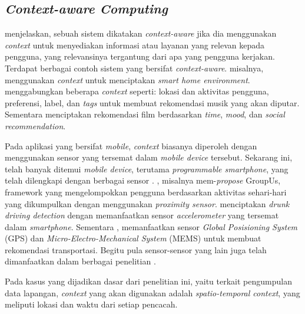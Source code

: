 \subsection{\textit{Context-aware Computing}}
\label{ssec:context-aware-computing}
\citep{dey_understanding_2001} menjelaskan, sebuah sistem dikatakan \textit{context-aware} jika dia menggunakan \textit{context} untuk menyediakan informasi atau layanan yang relevan kepada pengguna, yang relevansinya tergantung dari apa yang pengguna kerjakan. Terdapat berbagai contoh sistem yang bersifat \textit{context-aware}. \citep{tsai_context-aware_2016} misalnya, menggunakan \textit{context} untuk menciptakan \textit{smart home environment}. \citep{magara_mplist:_2016} menggabungkan beberapa \textit{context} seperti: lokasi dan aktivitas pengguna, preferensi, label, dan \textit{tags} untuk membuat rekomendasi musik yang akan diputar. Sementara \citep{said_introduction_2013} menciptakan rekomendasi film berdasarkan \textit{time}, \textit{mood}, dan \textit{social recommendation}.


Pada aplikasi yang bersifat \textit{mobile}, \textit{context} biasanya diperoleh dengan menggunakan sensor yang tersemat dalam \textit{mobile device} tersebut. Sekarang ini, telah banyak ditemui \textit{mobile device}, terutama \textit{programmable smartphone}, yang telah dilengkapi dengan berbagai sensor \citep{cao_mobile_2015}. \citep{do_groupus:_2011}, misalnya mem-\textit{propose} GroupUs, framework yang mengelompokkan pengguna berdasarkan aktivitas sehari-hari yang dikumpulkan dengan menggunakan \textit{proximity sensor}. \citep{dai_mobile_2010} menciptakan \textit{drunk driving detection} dengan memanfaatkan sensor \textit{accelerometer} yang tersemat dalam \textit{smartphone}. Sementara \citep{zou_context-aware_2016}, memanfaatkan sensor \textit{Global Posisioning System} (GPS) dan \textit{Micro-Electro-Mechanical System} (MEMS) untuk membuat rekomendasi transportasi. Begitu pula sensor-sensor yang lain juga telah dimanfaatkan dalam berbagai penelitian \citep{dai_perfalld:_2010, lu_soundsense:_2009, bao_movi:_2010, rubel_toward_2005, atzmueller_towards_2013}.


Pada kasus yang dijadikan dasar dari penelitian ini, yaitu terkait pengumpulan data lapangan, \textit{context} yang akan digunakan adalah \textit{spatio-temporal context}, yang meliputi lokasi dan waktu dari setiap pencacah.


